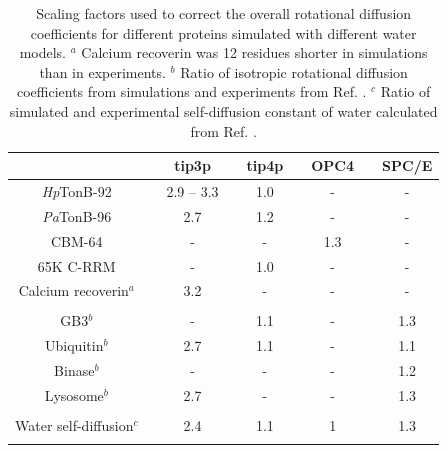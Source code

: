 \documentclass[journal=jpcbfk]{achemso}
\begin{document}
\begin{table}[!h]
  \centering
  \caption{Scaling factors used to correct the overall rotational diffusion coefficients for different proteins
    simulated with different water models.
    $^{a}$ Calcium recoverin was 12 residues shorter in simulations than in experiments.
    $^{b}$ Ratio of isotropic rotational diffusion coefficients from simulations and experiments from Ref. .
    $^{c}$ Ratio of simulated and experimental self-diffusion constant of water calculated from Ref. .  }\label{ROTdiffCOEFFSscaled}
  \begin{tabular}{c c c c c c c c c}
                                       &    & tip3p &  & tip4p && OPC4 && SPC/E \\
    \hline
    {\it Hp}TonB-92                    &    & 2.9 -- 3.3   &  & 1.0     && -  && - \\
    {\it Pa}TonB-96                    &    &  2.7    &  & 1.2   && -    && -\\
    CBM-64 \cite{heikkinen18}          &    &  -    &  & -     && 1.3  && -\\
    65K C-RRM \cite{norppa18}          &    & -     &  & 1.0     && -  && -\\
    Calcium recoverin$^{a}$ \cite{timr18}    &    &  3.2  &  & -     && -    && -\\
    &&&&&& \\
    GB3$^{b}$                           &    & -     &  & 1.1    && -   && 1.3 \\
    Ubiquitin$^{b}$                     &    & 2.7   &  & 1.1    && -   && 1.1 \\
    Binase$^{b}$                        &    & -     &  & -   && -   && 1.2 \\
    Lysosome$^{b}$                      &    & 2.7   &  & -    && -   && 1.3 \\
    &&&&&& \\
    Water self-diffusion$^{c}$  &    & 2.4   & & 1.1   &&  1 && 1.3 \\
    &&&&&& \\
  \end{tabular}
  \newline
  \flushleft
\end{table}

\pagebreak


\end{document}
